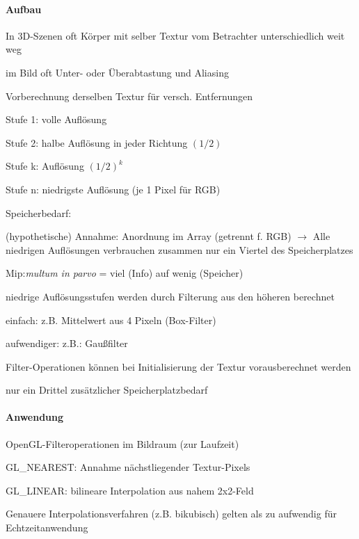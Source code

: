 \documentclass[landscape]{article}
\begin{document}
\begin{multicols}{3}
  \paragraph{Aufbau}
  \begin{itemize*}
    \item In 3D-Szenen oft Körper mit selber Textur vom Betrachter unterschiedlich weit weg 
    \item im Bild oft Unter- oder Überabtastung und Aliasing
    \item Vorberechnung derselben Textur für versch. Entfernungen
    \begin{itemize*}
      \item Stufe 1: volle Auflösung
      \item Stufe 2: halbe Auflösung in jeder Richtung $(1/2)$
      \item Stufe k: Auflösung $(1/2)^k$
      \item Stufe n: niedrigste Auflösung (je 1 Pixel für RGB)
    \end{itemize*}
    \item Speicherbedarf:
    \item (hypothetische) Annahme: Anordnung im Array (getrennt f. RGB) $\rightarrow$ Alle niedrigen Auflösungen verbrauchen zusammen nur ein Viertel des Speicherplatzes
    \item Mip:\textit{multum in parvo} = viel (Info) auf wenig (Speicher)
    \item niedrige Auflösungsstufen werden durch Filterung aus den höheren berechnet
    \begin{itemize*}
      \item einfach: z.B. Mittelwert aus 4 Pixeln (Box-Filter)
      \item aufwendiger: z.B.: Gaußfilter
    \end{itemize*}
    \item Filter-Operationen können bei Initialisierung der Textur vorausberechnet werden
    \item nur ein Drittel zusätzlicher Speicherplatzbedarf
  \end{itemize*}
  
  \paragraph{Anwendung}
  \begin{itemize*}
    \item OpenGL-Filteroperationen im Bildraum (zur Laufzeit)
    \item GL\_NEAREST: Annahme nächstliegender Textur-Pixels
    \item GL\_LINEAR: bilineare Interpolation aus nahem 2x2-Feld
    \item Genauere Interpolationsverfahren (z.B. bikubisch) gelten als zu aufwendig für Echtzeitanwendung
  \end{itemize*}
  

\end{multicols}
\end{document}
